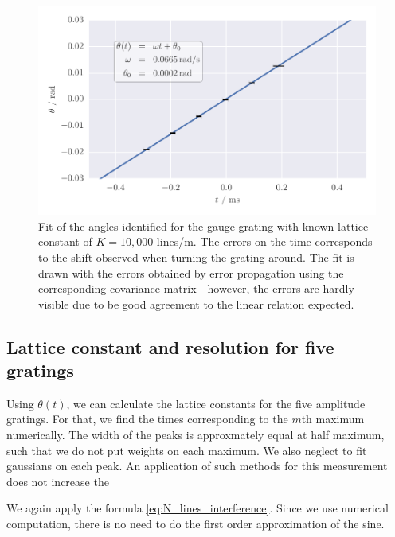\begin{figure}[htpb]
    \centering
    \includegraphics[width=1.0\linewidth]{figures/calibrate_fit}
    \caption{
        Fit of the angles identified for the gauge grating with known 
        lattice constant of $K = 10,000$ lines/m. The errors on the time corresponds to the
        shift observed when turning the grating around. The fit is drawn with the errors obtained 
        by error propagation using the corresponding covariance matrix - however, the errors 
        are hardly visible due to be good agreement to the linear relation expected. 
        }
    \label{fig:calibrate_fit}
\end{figure}

\subsection{Lattice constant and resolution for five gratings}
Using $\theta(t)$, we can calculate the lattice constants for the five amplitude gratings. 
For that, we find the times corresponding to the $m$th maximum numerically. The width 
of the peaks is approxmately equal at half maximum, such that we do not put weights 
on each maximum. We also neglect to fit gaussians on each peak. An application of such methods 
for this measurement does not increase the 

We again apply the formula \ref{eq:N_lines_interference}. Since we use numerical computation, 
there is no need to do the first order approximation of the sine.


